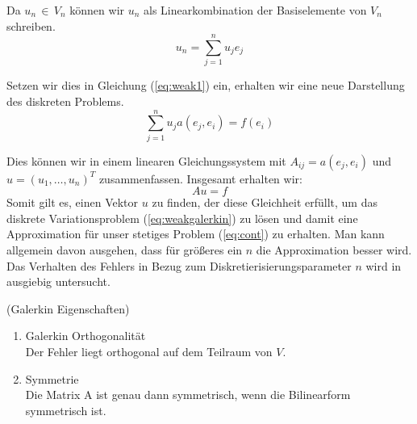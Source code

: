 Da $u_n \, \in \, V_n$ können wir $u_n$ als Linearkombination der Basiselemente von $V_n$ schreiben.
\begin{equation}
u_n = \sum_{j=1}^{n} u_j e_j
\end{equation}

Setzen wir dies in Gleichung (\ref{eq:weak1}) ein, erhalten wir eine neue Darstellung des diskreten Problems.
\begin{equation}
\sum_{j=1}^{n} u_j a( e_j, e_i ) = f(e_i)
\end{equation}

Dies können wir in einem linearen Gleichungssystem mit $A_{ij}=a(e_j,e_i)$ und $u=(u_1,\dots,u_n)^{T}$ zusammenfassen. Insgesamt erhalten wir:
\begin{equation}
Au=f
\end{equation}
Somit gilt es, einen Vektor $u$ zu finden, der diese Gleichheit erfüllt, um das diskrete Variationsproblem (\ref{eq:weakgalerkin}) zu lösen und damit eine Approximation für unser stetiges Problem (\ref{eq:cont}) zu erhalten. Man kann allgemein davon ausgehen, dass für größeres ein $n$ die Approximation besser wird. Das Verhalten des Fehlers in Bezug zum Diskretierisierungsparameter $n$ wird in \cite[154]{Numerik} ausgiebig untersucht.

\newpage

\begin{Bemerkung} (Galerkin Eigenschaften) 
\begin{enumerate} 
\item Galerkin Orthogonalität \\
Der Fehler liegt orthogonal auf dem Teilraum von $V$.
\item Symmetrie \\
Die Matrix A ist genau dann symmetrisch, wenn die Bilinearform symmetrisch ist.
\end{enumerate}
\end{Bemerkung}

